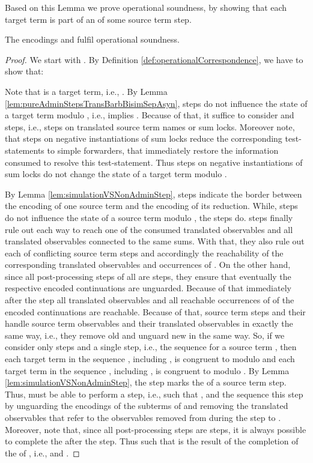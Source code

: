 \documentclass[]{llncs}
\begin{document}
Based on this Lemma we prove operational soundness, by showing that each target term is part of an \simulation of some source term step.

\begin{lemma} \label{lem:operationalSoundness}
	The encodings  and  fulfil operational soundness.
\end{lemma}

\begin{proof}
	We start with . By Definition \ref{def:operationalCorrespondence}, we have to show that:
	
	Note that  is a target term, i.e., . By Lemma \ref{lem:pureAdminStepsTransBarbBisimSepAsyn}, \pure \admin steps do not influence the state of a target term modulo , i.e.,  implies . Because of that, it suffice to consider \impure \admin and \nonAdmin steps, i.e., steps on translated source term names or sum locks. Moreover note, that steps on negative instantiations of sum locks reduce the corresponding test-statements to simple forwarders, that immediately restore the information consumed to resolve this test-statement. Thus \impure \admin steps on negative instantiations of sum locks do not change the state of a target term modulo .
	
	By Lemma \ref{lem:simulationVSNonAdminStep}, \nonAdmin steps indicate the border between the encoding of one source term and the encoding of its reduction. While, \pure \admin steps do not influence the state of a source term modulo , the \nonAdmin steps do. \NonAdmin steps finally rule out each way to reach one of the consumed translated observables and all translated observables connected to the same sums. With that, they also rule out each \simulation of conflicting source term steps and accordingly the reachability of the corresponding translated observables and occurrences of . On the other hand, since all post-processing steps of all \simulations are \pure \admin steps, they ensure that eventually the respective encoded continuations are unguarded. Because of that immediately after the \nonAdmin step all translated observables and all reachable occurrences of  of the encoded continuations are reachable. Because of that, source term steps and their \simulations handle source term observables and their translated observables in exactly the same way, i.e., they remove old and unguard new in the same way. So, if we consider only \pure \admin steps and a single \nonAdmin step, i.e., the sequence  for a source term , then each target term in the sequence , including , is congruent to  modulo  and each target term in the sequence , including , is congruent to  modulo . By Lemma \ref{lem:simulationVSNonAdminStep}, the step  marks the \simulation of a source term step. Thus,  must be able to perform a step, i.e.,  such that , and the sequence  \simulates this step by unguarding the encodings of the subterms of  and removing the translated observables that refer to the observables removed from  during the step to . Moreover, note that, since all post-processing steps are \pure \admin steps, it is always possible to complete the \simulation after the \nonAdmin step. Thus  such that  is the result of the completion of the \simulation of , i.e.,  and .
	

\end{proof}
\end{document}

